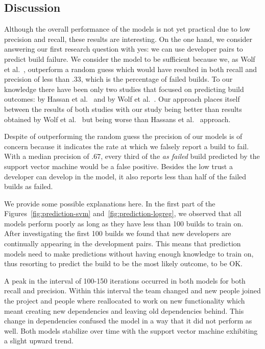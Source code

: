 \subsection{Discussion}
Although the overall performance of the models is not yet practical due to low
precision and recall, these results are interesting. On the one hand, we consider
answering our first research question with yes: we can use developer pairs to
predict build failure. We consider the model to be sufficient because we, as Wolf
et al.~\cite{wolf:icse:2009}, outperform a random guess which would have
resulted in both recall and precision of less than $.33$, which is the percentage of failed
builds. To our knowledge there have been only two studies that focused on
predicting build outcomes: by Hassan et al.~\cite{hassan:ase:2006} and by Wolf et
al.~\cite{wolf:icse:2009}. Our approach places itself between the results of both
studies with our study being better than results obtained by Wolf et
al.~\cite{wolf:icse:2009} but being worse than Hassans et
al.~\cite{hassan:ase:2006} approach.

Despite of outperforming the random guess the precision of our models is of concern because
it indicates the rate at which we falsely report a build to fail. With a median
 precision of $.67$, every third of the \emph{as failed} build predicted by the support
 vector machine would be a false positive. Besides the low trust a developer
 can develop in the model, it also reports less than half of the failed builds
 as failed.


We provide some possible explanations here. In the first part of the
Figures~\ref{fig:prediction-svm} and~\ref{fig:prediction-logreg}, we observed
that all models perform poorly as long as they have less than 100 builds to train
on. After investigating the first 100 builds we found that new
developers are continually appearing in the development pairs. This means that
prediction models need to make predictions without having enough knowledge to
train on, thus resorting to predict the build to be the most likely outcome, to be OK.

A peak in the interval of 100-150 iterations occurred in both models for both recall and precision.
Within this interval the team changed and new people joined the project and people where reallocated to work on new functionality which meant creating new dependencies and leaving old dependencies behind.
This change in dependencies confused the model in a way that it did not perform as well.
Both models stabilize over time with the support vector machine exhibiting a slight upward trend.

